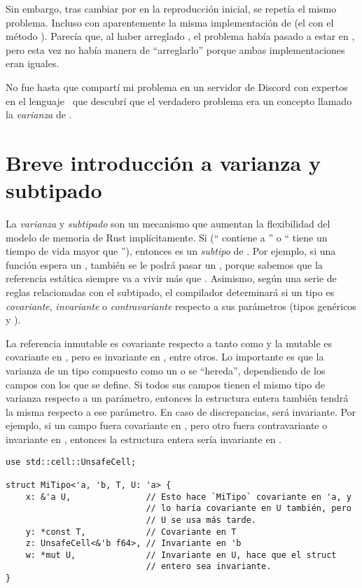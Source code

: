 Sin embargo, tras cambiar  por  en la
reproducción inicial, se repetía el mismo problema. Incluso con aparentemente la
misma implementación de  (el \trait con el método ). Parecía
que, al haber arreglado , el problema había pasado a estar en
, pero esta vez no había manera de ``arreglarlo'' porque ambas
implementaciones eran iguales.

No fue hasta que compartí mi problema en un servidor de Discord con expertos en
el lenguaje~\cite{rustdiscord} que descubrí que el verdadero problema era un
concepto llamado la \emph{varianza} de .

\section{Breve introducción a varianza y subtipado}

La \emph{varianza} y \emph{subtipado} son un mecanismo que aumentan la
flexibilidad del modelo de memoria de Rust implícitamente. Si 
(`` contiene a '' o `` tiene un tiempo de vida mayor
que ''), entonces  es un \emph{subtipo} de . Por
ejemplo, si una función espera un , también se le podrá pasar un
, porque sabemos que la referencia estática 
siempre va a vivir más que . Asimismo, según una serie de reglas
relacionadas con el subtipado, el compilador determinará si un tipo es
\emph{covariante}, \emph{invariante} o \emph{contravariante} respecto a sus
parámetros (tipos genéricos y \lifetimes).

La referencia inmutable  es covariante respecto a tanto 
como  y la mutable  es covariante en , pero es
invariante en , entre otros. Lo importante es que la varianza de un
tipo compuesto como un  o  se ``hereda'', dependiendo de
los campos con los que se define. Si todos sus campos tienen el mismo tipo de
varianza respecto a un parámetro, entonces la estructura entera también tendrá
la misma respecto a ese parámetro. En caso de discrepancias, será invariante.
Por ejemplo, si un campo fuera covariante en , pero otro fuera
contravariante o invariante en , entonces la estructura entera sería
invariante en .

\begin{verbatim}
use std::cell::UnsafeCell;

struct MiTipo<'a, 'b, T, U: 'a> {
    x: &'a U,               // Esto hace `MiTipo` covariante en 'a, y
                            // lo haría covariante en U también, pero
                            // U se usa más tarde.
    y: *const T,            // Covariante en T
    z: UnsafeCell<&'b f64>, // Invariante en 'b
    w: *mut U,              // Invariante en U, hace que el struct
                            // entero sea invariante.
}
\end{verbatim}

